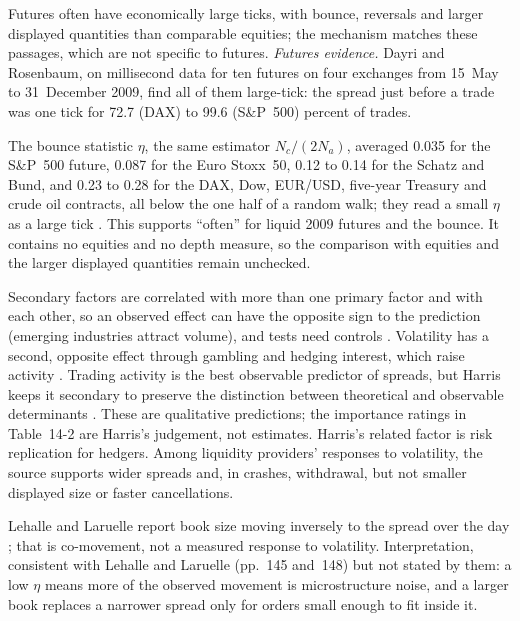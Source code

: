 \begin{qfresult}
Futures often have economically large ticks, with bounce, reversals and larger displayed quantities than comparable equities; the mechanism matches these passages, which are not specific to futures. \emph{Futures evidence.} Dayri and Rosenbaum, on millisecond data for ten futures on four exchanges from 15~May to 31~December 2009, find all of them large-tick: the spread just before a trade was one tick for 72.7 (DAX) to 99.6 (S\&P~500) percent of trades.

The bounce statistic $\eta$, the same estimator $N_c/(2N_a)$, averaged 0.035 for the S\&P~500 future, 0.087 for the Euro Stoxx~50, 0.12 to 0.14 for the Schatz and Bund, and 0.23 to 0.28 for the DAX, Dow, EUR/USD, five-year Treasury and crude oil contracts, all below the one half of a random walk; they read a small $\eta$ as a large tick \citep[sec.~3.2, Table~1, pp.~18--19; $\eta$ estimator, p.~15]{dayri-rosenbaum-2013}. This supports ``often'' for liquid 2009 futures and the bounce. It contains no equities and no depth measure, so the comparison with equities and the larger displayed quantities remain unchecked.

 Secondary factors are correlated with more than one primary factor and with each other, so an observed effect can have the opposite sign to the prediction (emerging industries attract volume), and tests need controls \citep[same chap., p.~314]{alpha-harris}. Volatility has a second, opposite effect through gambling and hedging interest, which raise activity \citep[same chap., pp.~316--317]{alpha-harris}. Trading activity is the best observable predictor of spreads, but Harris keeps it secondary to preserve the distinction between theoretical and observable determinants \citep[same chap., p.~312]{alpha-harris}. These are qualitative predictions; the importance ratings in Table~14-2 are Harris's judgement, not estimates. Harris's related factor is risk replication for hedgers. Among liquidity providers' responses to volatility, the source supports wider spreads and, in crashes, withdrawal, but not smaller displayed size or faster cancellations.

Lehalle and Laruelle report book size moving inversely to the spread over the day \citep[chap.~2, sec.~2.2, p.~148]{alpha-laruelle}; that is co-movement, not a measured response to volatility. Interpretation, consistent with Lehalle and Laruelle (pp.~145 and~148) but not stated by them: a low $\eta$ means more of the observed movement is microstructure noise, and a larger book replaces a narrower spread only for orders small enough to fit inside it.


\end{qfresult}
